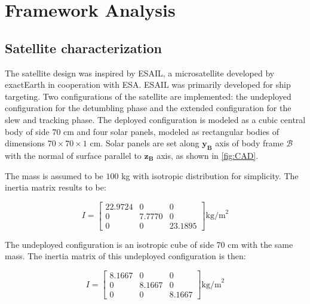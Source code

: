 \section{Framework Analysis}
\label{sec:framework}


\subsection{Satellite characterization}
\label{subsec:sat_characterization}

The satellite design was inspired by ESAIL, a microsatellite developed by exactEarth in cooperation with ESA. ESAIL was primarily developed for ship targeting.\cite{esail_site} Two configurations of the satellite are implemented: the undeployed configuration for the detumbling phase and the extended configuration for the slew and tracking phase. The deployed configuration is modeled as a cubic central body of side $70$ cm and four solar panels, modeled as rectangular bodies of dimensions $70 \times 70 \times 1$ cm. Solar panels are set along $\boldsymbol{y_B}$ axis of body frame $\mathcal{B}$ with the normal of surface parallel to $\boldsymbol{z_B}$ axis, as shown in \autoref{fig:CAD}.


The mass is assumed to be $100$ kg with isotropic distribution for simplicity. The inertia matrix results to be:

\begin{equation} \label{eq:dep_matrix}
    I =
    \begin{bmatrix}
        22.9724 & 0 & 0 \\
        0 & 7.7770 & 0 \\
        0 & 0 & 23.1895
    \end{bmatrix} \text{kg/m}^2
\end{equation}

The undeployed configuration is an isotropic cube of side 70 cm with the same mass. The inertia matrix of this undeployed configuration is then:

\begin{equation} \label{eq:undep_matrix}
    I =
    \begin{bmatrix}
        8.1667 & 0 & 0 \\
        0 & 8.1667 & 0 \\
        0 & 0 & 8.1667
    \end{bmatrix} \text{kg/m}^2
\end{equation}


